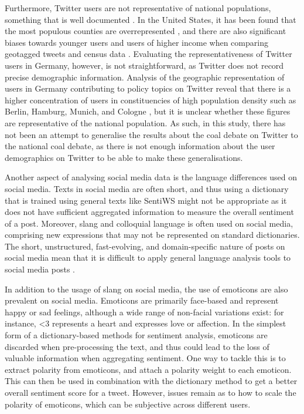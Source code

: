 \documentclass[12pt,onecolumn,twoside]{layout}
\begin{document}
Furthermore, Twitter users are not representative of national populations, something that is well documented \cite{Duggan2015, Mislove2011, Malik2015}. In the United States, it has been found that the most populous counties are overrepresented \cite{Mislove2011}, and there are also significant biases towards younger users and users of higher income when comparing geotagged tweets and census data \cite{Malik2015}. Evaluating the representativeness of Twitter users in Germany, however, is not straightforward, as Twitter does not record precise demographic information. Analysis of the geographic representation of users in Germany contributing to policy topics on Twitter reveal that there is a higher concentration of users in constituencies of high population density such as Berlin, Hamburg, Munich, and Cologne \cite{Fernandez2014}, but it is unclear whether these figures are representative of the national population. As such, in this study, there has not been an attempt to generalise the results about the coal debate on Twitter to the national coal debate, as there is not enough information about the user demographics on Twitter to be able to make these generalisations. 

Another aspect of analysing social media data is the language differences used on social media. Texts in social media are often short, and thus using a dictionary that is trained using general texts like SentiWS might not be appropriate as it does not have sufficient aggregated information to measure the overall sentiment of a post. Moreover, slang and colloquial language is often used on social media, comprising new expressions that may not be represented on standard dictionaries. The short, unstructured, fast-evolving, and domain-specific nature of posts on social media mean that it is difficult to apply general language analysis tools to social media posts \cite{Hu2013}. 

In addition to the usage of slang on social media, the use of emoticons are also prevalent on social media. Emoticons are primarily face-based and represent happy or sad feelings, although a wide range
of non-facial variations exist: for instance, <3 represents a heart and expresses love or affection. In the simplest form of a dictionary-based methods for sentiment analysis, emoticons are discarded when pre-processing the text, and thus could lead to the loss of valuable information when aggregating sentiment. One way to tackle this is to extract polarity from emoticons, and attach a polarity weight to each emoticon. This can then be used in combination with the dictionary method to get a better overall sentiment score for a tweet. However, issues remain as to how to scale the polarity of emoticons, which can be subjective across different users. 
\end{document}
